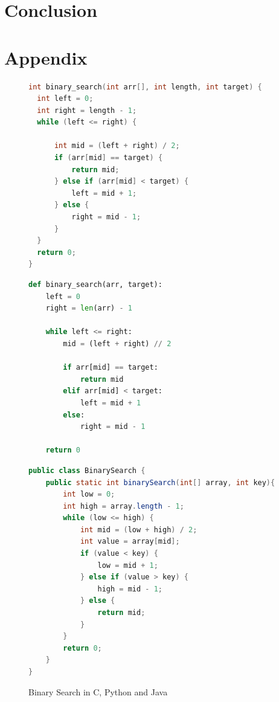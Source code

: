 \documentclass[english,submission]{programming}
\begin{document}
\section{Conclusion}
\label{sec:conclusion}

\printbibliography

\newpage
\section*{Appendix}
\label{sec:appendix}

\begin{figure}[h]
  \centering
    \begin{lstlisting}[language=C]
int binary_search(int arr[], int length, int target) {
  int left = 0;
  int right = length - 1;
  while (left <= right) {

      int mid = (left + right) / 2;
      if (arr[mid] == target) {
          return mid;
      } else if (arr[mid] < target) {
          left = mid + 1;
      } else {
          right = mid - 1;
      }
  }
  return 0;
}
    \end{lstlisting}
  
    \begin{lstlisting}[language=Python]
def binary_search(arr, target):
    left = 0
    right = len(arr) - 1

    while left <= right:
        mid = (left + right) // 2

        if arr[mid] == target:
            return mid
        elif arr[mid] < target:
            left = mid + 1
        else:
            right = mid - 1

    return 0 
    \end{lstlisting}
 
    \begin{lstlisting}[language=Java]
public class BinarySearch {
    public static int binarySearch(int[] array, int key){
        int low = 0;
        int high = array.length - 1;
        while (low <= high) {
            int mid = (low + high) / 2;
            int value = array[mid];
            if (value < key) {
                low = mid + 1;
            } else if (value > key) {
                high = mid - 1;
            } else {
                return mid;
            }
        }
        return 0;
    }
}
      \end{lstlisting}
  \caption{Binary Search in C, Python and Java}
  \label{fig:binary-search}
\end{figure}
\end{document}
